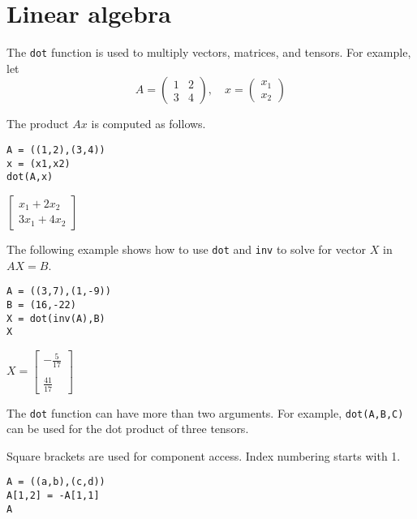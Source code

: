 \documentclass[12pt]{article}
\begin{document}
\section*{Linear algebra}

The \verb$dot$ function is used to multiply vectors, matrices, and tensors.
For example, let
\begin{equation*}
A=\begin{pmatrix}1&2\\3&4\end{pmatrix},
\quad
x=\begin{pmatrix}x_1\\x_2\end{pmatrix}
\end{equation*}

The product $Ax$ is computed as follows.

{\color{blue}
\begin{verbatim}
A = ((1,2),(3,4))
x = (x1,x2)
dot(A,x)
\end{verbatim}
}

$\displaystyle
\begin{bmatrix}
x_1+2x_2
\\[1ex]
3x_1+4x_2
\end{bmatrix}
$

\bigskip

The following example shows how to use \verb$dot$ and \verb$inv$ to solve for
vector $X$ in $AX=B$.

{\color{blue}
\begin{verbatim}
A = ((3,7),(1,-9))
B = (16,-22)
X = dot(inv(A),B)
X
\end{verbatim}
}

$\displaystyle
X=
\begin{bmatrix}
-\tfrac{5}{17}
\\
\\
\tfrac{41}{17}
\end{bmatrix}
$

\bigskip

The \verb$dot$ function can have more than two arguments.
For example, \verb$dot(A,B,C)$ can be used for the dot product of three tensors.

\bigskip

Square brackets are used for component access.
Index numbering starts with 1.

{\color{blue}
\begin{verbatim}
A = ((a,b),(c,d))
A[1,2] = -A[1,1]
A
\end{verbatim}
}
\end{document}
